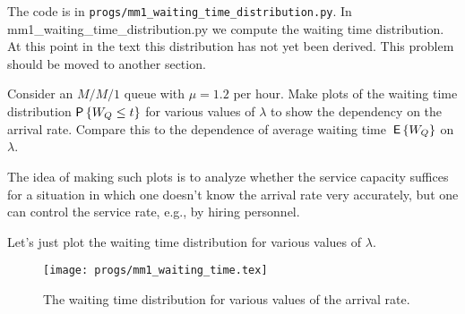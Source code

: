 \begin{question}[use=false]
  The code is in \texttt{progs/mm1\_waiting\_time_distribution.py}. In
  mm1\_waiting\_time_distribution.py we compute the waiting time
  distribution. At this point in the text this distribution has not
  yet been derived.  This problem should be moved to another section.

Consider an $M/M/1$ queue with $\mu=1.2$ per hour. Make plots of the
waiting time distribution $\P{W_Q\leq t}$ for various values of
$\lambda$ to show the dependency on the arrival rate. Compare this to
the dependence of average waiting time $\,\mathsf{E}\left\{W_Q\right\}$ on $\lambda$.

The idea of making such plots is to analyze
  whether the service capacity suffices for a situation in which one
  doesn't know the arrival rate very accurately, but one can control
  the service rate, e.g., by hiring personnel.
  \begin{solution}
    Let's just plot the waiting time distribution
for various values of $\lambda$. 


\begin{figure}[ht]
  \centering
\texttt{[image: progs/mm1\_waiting\_time.tex]}
  \caption{The waiting time distribution for various values of the arrival rate.}
  \label{fig:waitingtime}
\end{figure}


\end{solution}

\end{question}




